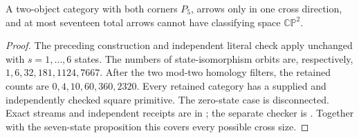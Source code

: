 \begin{corollary}
\label{CP2:A-P5-P5-through17}
A two-object category with both corners $P_5$, arrows only in one
cross direction, and at most seventeen total arrows cannot have
classifying space $\mathbb{CP}^2$.
\end{corollary}
\begin{proof}
The preceding construction and independent literal check apply unchanged
with $s=1,\ldots,6$ states. The numbers of state-isomorphism orbits are,
respectively, $1,6,32,181,1124,7667$. After the two mod-two homology
filters, the retained counts are $0,4,10,60,360,2320$. Every retained
category has a supplied and independently checked square primitive.
The zero-state case is disconnected. Exact streams and independent
receipts are in ; the separate checker
is . Together with the
seven-state proposition this covers every possible cross size.
\end{proof}
